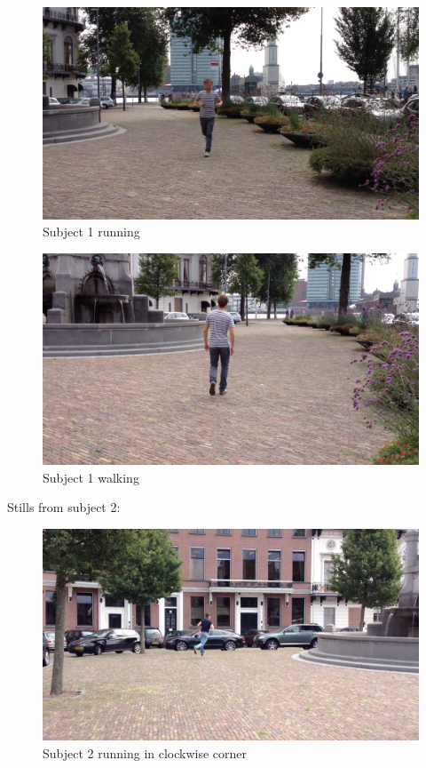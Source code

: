 \begin{figure}
\centering
  \includegraphics[width=1\textwidth]{./Figures/chapter6/data_collection/stills/jos_run.png}
  \caption[Recording still 3]{Subject 1 running}
  \label{fig:data_gathering_still_1_running_2}
\end{figure}

\begin{figure}
\centering
  \includegraphics[width=1\textwidth]{./Figures/chapter6/data_collection/stills/jos_walking.png}
  \caption[Recording still 5]{Subject 1 walking}
  \label{fig:data_gathering_still_1_walk}
\end{figure}

Stills from subject 2:

\begin{figure}
\centering
  \includegraphics[width=1\textwidth]{./Figures/chapter6/data_collection/stills/roemer_run_cw.png}
  \caption[Recording still 6]{Subject 2 running in clockwise corner}
  \label{fig:data_gathering_still_2_run}
\end{figure}


